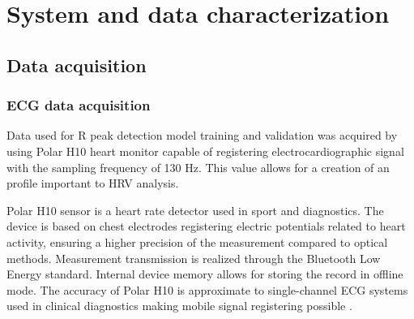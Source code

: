 \documentclass[journal]{IEEEtran}
\begin{document}
\section{System and data characterization}
\subsection{Data acquisition}
\subsubsection{ECG data acquisition}
Data used for R peak detection model training and validation was acquired by using Polar H10 heart monitor capable of registering electrocardiographic signal with the sampling frequency of 130 Hz. This value allows for a creation of an profile important to HRV analysis.

Polar H10 sensor is a heart rate detector used in sport and diagnostics. The device is based on chest electrodes registering electric potentials related to heart activity, ensuring a higher precision of the measurement compared to optical methods. Measurement transmission is realized through the Bluetooth Low Energy standard. Internal device memory allows for storing the record in offline mode. The accuracy of Polar H10 is approximate to single-channel ECG systems used in clinical diagnostics making mobile signal registering possible \cite{21}.
\end{document}

